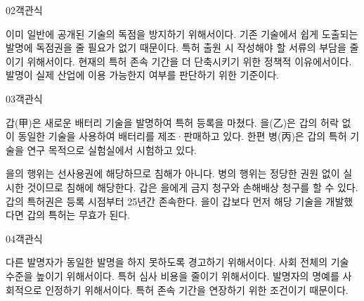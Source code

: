 \documentclass[fs85,seriesWit]{korfarm-base}
\begin{document}
\begin{kfQBlock}{02}{객관식}
\begin{kfChoices}
\kfChoice 이미 일반에 공개된 기술의 독점을 방지하기 위해서이다.
\kfChoice 기존 기술에서 쉽게 도출되는 발명에 독점권을 줄 필요가 없기 때문이다.
\kfChoice 특허 출원 시 작성해야 할 서류의 부담을 줄이기 위해서이다.
\kfChoice 현재의 특허 존속 기간을 더 단축시키기 위한 정책적 이유에서이다.
\kfChoice 발명이 실제 산업에 이용 가능한지 여부를 판단하기 위한 기준이다.
\end{kfChoices}
\end{kfQBlock}

\begin{kfQBlock}{03}{객관식}
\begin{kfEvidence}갑(甲)은 새로운 배터리 기술을 발명하여 특허 등록을 마쳤다. 을(乙)은 갑의 허락 없이 동일한 기술을 사용하여 배터리를 제조·판매하고 있다. 한편 병(丙)은 갑의 특허 기술을 연구 목적으로 실험실에서 시험하고 있다.\end{kfEvidence}
\begin{kfChoices}
\kfChoice 을의 행위는 선사용권에 해당하므로 침해가 아니다.
\kfChoice 병의 행위는 정당한 권원 없이 실시한 것이므로 침해에 해당한다.
\kfChoice 갑은 을에게 금지 청구와 손해배상 청구를 할 수 있다.
\kfChoice 갑의 특허권은 등록 시점부터 25년간 존속한다.
\kfChoice 을이 갑보다 먼저 해당 기술을 개발했다면 갑의 특허는 무효가 된다.
\end{kfChoices}
\end{kfQBlock}

\begin{kfQBlock}{04}{객관식}
\begin{kfChoices}
\kfChoice 다른 발명자가 동일한 발명을 하지 못하도록 경고하기 위해서이다.
\kfChoice 사회 전체의 기술 수준을 높이기 위해서이다.
\kfChoice 특허 심사 비용을 줄이기 위해서이다.
\kfChoice 발명자의 명예를 사회적으로 인정하기 위해서이다.
\kfChoice 특허 존속 기간을 연장하기 위한 조건이기 때문이다.
\end{kfChoices}
\end{kfQBlock}

\kfEndMC
\end{document}
